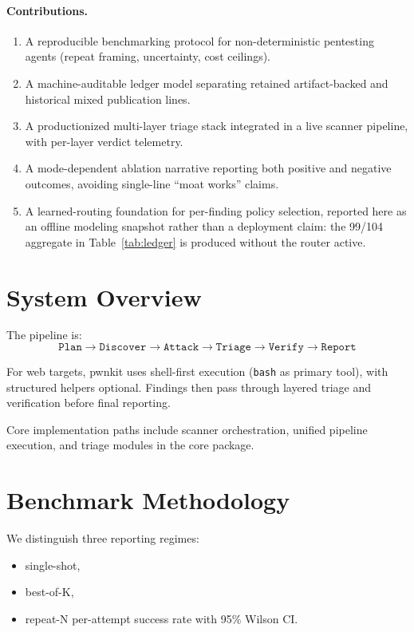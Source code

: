 \documentclass[11pt]{article}
\begin{document}
\paragraph{Contributions.}
\begin{enumerate}[leftmargin=*,itemsep=2pt]
  \item A reproducible benchmarking protocol for non-deterministic pentesting
  agents (repeat framing, uncertainty, cost ceilings).
  \item A machine-auditable ledger model separating retained artifact-backed and
  historical mixed publication lines.
  \item A productionized multi-layer triage stack integrated in a live scanner
  pipeline, with per-layer verdict telemetry.
  \item A mode-dependent ablation narrative reporting both positive and negative
  outcomes, avoiding single-line ``moat works'' claims.
  \item A learned-routing foundation for per-finding policy selection,
  reported here as an offline modeling snapshot rather than a deployment
  claim: the 99/104 aggregate in Table~\ref{tab:ledger} is produced
  without the router active.
\end{enumerate}

\section{System Overview}

The pipeline is:
\[
\texttt{Plan} \rightarrow \texttt{Discover} \rightarrow \texttt{Attack} \rightarrow \texttt{Triage} \rightarrow \texttt{Verify} \rightarrow \texttt{Report}
\]

For web targets, pwnkit uses shell-first execution (\texttt{bash} as primary
tool), with structured helpers optional. Findings then pass through layered
triage and verification before final reporting.

Core implementation paths include scanner orchestration, unified pipeline
execution, and triage modules in the core package.

\section{Benchmark Methodology}

We distinguish three reporting regimes:
\begin{itemize}
  \item single-shot,
  \item best-of-K,
  \item repeat-N per-attempt success rate with 95\% Wilson CI.
\end{itemize}
\end{document}
